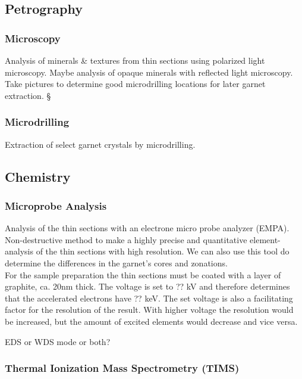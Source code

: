 \documentclass[a4paper,11pt,titlepage]{article}
\begin{document}
\subsection{Petrography}

\subsubsection{Microscopy}

Analysis of minerals & textures from thin sections using polarized light microscopy. Maybe analysis of opaque minerals with reflected light microscopy. Take pictures to determine good microdrilling locations for later garnet extraction.
§

\subsubsection{Microdrilling}

Extraction of select garnet crystals by microdrilling.

\subsection{Chemistry}

\subsubsection{Microprobe Analysis}

Analysis of the thin sections with an electrone micro probe analyzer (EMPA). Non-destructive method to make a highly precise and quantitative element-analysis of the thin sections with high resolution. We can also use this tool do determine the differences in the garnet's cores and zonations.
\\
\noindent For the sample preparation the thin sections must be coated with a layer of graphite, ca. 20nm thick. The voltage is set to ?? kV and therefore determines that the accelerated electrons have ?? keV. The set voltage is also a facilitating factor for the resolution of the result. With higher voltage the resolution would be increased, but the amount of excited elements would decrease and vice versa. 

EDS or WDS mode or both?

\subsubsection{Thermal Ionization Mass Spectrometry (TIMS)}
\end{document}
